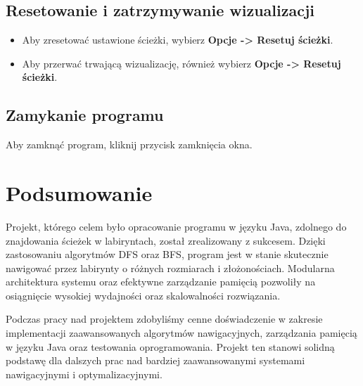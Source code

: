 \documentclass{article}
\begin{document}
\subsection{Resetowanie i zatrzymywanie wizualizacji}
\begin{itemize}
    \item Aby zresetować ustawione ścieżki, wybierz \textbf{Opcje -> Resetuj ścieżki}.
    \item Aby przerwać trwającą wizualizację, również wybierz \textbf{Opcje -> Resetuj ścieżki}.
\end{itemize}

\subsection{Zamykanie programu}
Aby zamknąć program, kliknij przycisk zamknięcia okna.


\section{Podsumowanie}

Projekt, którego celem było opracowanie programu w języku Java, zdolnego do znajdowania ścieżek w labiryntach, został zrealizowany z sukcesem. Dzięki zastosowaniu algorytmów DFS oraz BFS, program jest w stanie skutecznie nawigować przez labirynty o różnych rozmiarach i złożonościach. Modularna architektura systemu oraz efektywne zarządzanie pamięcią pozwoliły na osiągnięcie wysokiej wydajności oraz skalowalności rozwiązania.

\vspace{5mm}

Podczas pracy nad projektem zdobyliśmy cenne doświadczenie w zakresie implementacji zaawansowanych algorytmów nawigacyjnych, zarządzania pamięcią w języku Java oraz testowania oprogramowania. Projekt ten stanowi solidną podstawę dla dalszych prac nad bardziej zaawansowanymi systemami nawigacyjnymi i optymalizacyjnymi.
\end{document}
